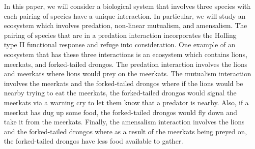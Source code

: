 In this paper, we will consider a biological system that involves three species with each pairing of species have a unique interaction. In particular, we will study an ecosystem which involves predation, non-linear mutualism, and amensalism. The pairing of species that are in a predation interaction incorporates the Holling type II functional response and refuge into consideration. One example of an ecosystem that has these three interactions is an ecosystem which contains lions, meerkats, and forked-tailed drongos. The predation interaction involves the lions and meerkats where lions would prey on the meerkats. The mutualism interaction involves the meerkats and the forked-tailed drongos where if the lions would be nearby trying to eat the meerkats, the forked-tailed drongos would signal the meerkats via a warning cry to let them know that a predator is nearby. Also, if a meerkat has dug up some food, the forked-tailed drongos would fly down and take it from the meerkats. Finally, the amensalism interaction involves the lions and the forked-tailed drongos where as a result of the meerkats being preyed on, the forked-tailed drongos have less food available to gather.